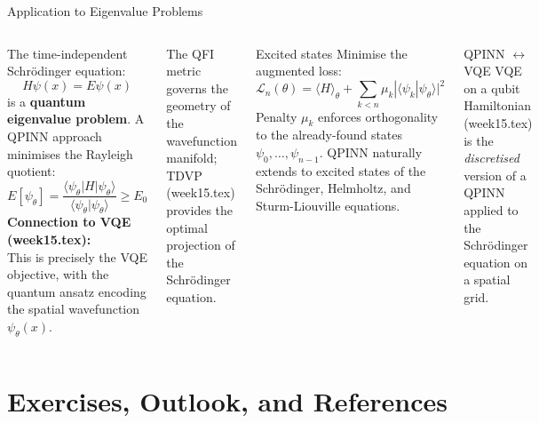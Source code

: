 \documentclass[aspectratio=169,10pt]{beamer}
\begin{document}
\begin{frame}{Application to Eigenvalue Problems}
  \begin{columns}[T]
      The time-independent Schrödinger equation:
      \[
        H\psi(x) = E\psi(x)
      \]
      is a \textbf{quantum eigenvalue problem}.
      A QPINN approach minimises the Rayleigh quotient:
      \[
        E[\psi_\theta]
        = \frac{\langle\psi_\theta|H|\psi_\theta\rangle}
               {\langle\psi_\theta|\psi_\theta\rangle}
        \ge E_0
      \]
      \textbf{Connection to VQE (week15.tex):}\\
      This is precisely the VQE objective, with the quantum
      ansatz encoding the spatial wavefunction $\psi_\theta(x)$.

      The QFI metric governs the geometry of the wavefunction
      manifold; TDVP (week15.tex) provides the optimal
      projection of the Schrödinger equation.
      \begin{block}{Excited states}
        Minimise the augmented loss:
        \[
          \mathcal{L}_n(\theta)
          = \langle H\rangle_\theta
            + \sum_{k<n}\mu_k|\langle\psi_k|\psi_\theta\rangle|^2
        \]
        Penalty $\mu_k$ enforces orthogonality to the
        already-found states $\psi_0,\ldots,\psi_{n-1}$.
        QPINN naturally extends to excited states
        of the Schrödinger, Helmholtz, and
        Sturm-Liouville equations.
      \end{block}
      \begin{alertblock}{QPINN $\leftrightarrow$ VQE}
        VQE on a qubit Hamiltonian (week15.tex) is the
        \emph{discretised} version of a QPINN applied to
        the Schrödinger equation on a spatial grid.
      \end{alertblock}
  \end{columns}
\end{frame}

\section{Exercises, Outlook, and References}
\end{document}
